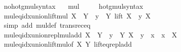 \begin{isabellebody}
\ no{\isacharunderscore}{\kern0pt}hotg{\isacharunderscore}{\kern0pt}mul{\isacharunderscore}{\kern0pt}syntax\ \ \isamarkupfalse%
\ mul\ {\isacharparenleft}{\kern0pt}\ {\isachardoublequoteopen}{\isacharasterisk}{\kern0pt}{\isachardoublequoteclose}\ {}{}{\isacharparenright}{\kern0pt}\ \isamarkupfalse%
\isanewline
{}\isamarkupfalse%
\ hotg{\isacharunderscore}{\kern0pt}mul{\isacharunderscore}{\kern0pt}syntax\isanewline
\isanewline
{}\isamarkupfalse%
\ mul{\isacharunderscore}{\kern0pt}eq{\isacharunderscore}{\kern0pt}idx{\isacharunderscore}{\kern0pt}union{\isacharunderscore}{\kern0pt}lift{\isacharunderscore}{\kern0pt}mul{\isacharcolon}{\kern0pt}\ {\isachardoublequoteopen}X\ {\isacharasterisk}{\kern0pt}\ Y\ {\isacharequal}{\kern0pt}\ {\isacharparenleft}{\kern0pt}{\isasymUnion}y\ {\isasymin}\ Y{\isachardot}{\kern0pt}\ lift\ {\isacharparenleft}{\kern0pt}X\ {\isacharasterisk}{\kern0pt}\ y{\isacharparenright}{\kern0pt}\ X{\isacharparenright}{\kern0pt}{\isachardoublequoteclose}\isanewline
%
\isadelimproof
\ \ %
\endisadelimproof
%
\isatagproof
{}\isamarkupfalse%
\ {\isacharparenleft}{\kern0pt}simp\ add{\isacharcolon}{\kern0pt}\ mul{\isacharunderscore}{\kern0pt}def\ transrec{\isacharunderscore}{\kern0pt}eq{\isacharparenright}{\kern0pt}%
\endisatagproof
{\isafoldproof}%
%
\isadelimproof
\isanewline
%
\endisadelimproof
\isanewline
{}\isamarkupfalse%
\ mul{\isacharunderscore}{\kern0pt}eq{\isacharunderscore}{\kern0pt}idx{\isacharunderscore}{\kern0pt}union{\isacharunderscore}{\kern0pt}repl{\isacharunderscore}{\kern0pt}mul{\isacharunderscore}{\kern0pt}add{\isacharcolon}{\kern0pt}\ {\isachardoublequoteopen}X\ {\isacharasterisk}{\kern0pt}\ Y\ {\isacharequal}{\kern0pt}\ {\isacharparenleft}{\kern0pt}{\isasymUnion}y\ {\isasymin}\ Y{\isachardot}{\kern0pt}\ {\isacharbraceleft}{\kern0pt}X\ {\isacharasterisk}{\kern0pt}\ y\ {\isacharplus}{\kern0pt}\ x\ {\isacharbar}{\kern0pt}\ x\ {\isasymin}\ X{\isacharbraceright}{\kern0pt}{\isacharparenright}{\kern0pt}{\isachardoublequoteclose}\isanewline
%
\isadelimproof
\ \ %
\endisadelimproof
%
\isatagproof
{}\isamarkupfalse%
\ mul{\isacharunderscore}{\kern0pt}eq{\isacharunderscore}{\kern0pt}idx{\isacharunderscore}{\kern0pt}union{\isacharunderscore}{\kern0pt}lift{\isacharunderscore}{\kern0pt}mul{\isacharbrackleft}{\kern0pt}of\ X\ Y{\isacharbrackright}{\kern0pt}\ lift{\isacharunderscore}{\kern0pt}eq{\isacharunderscore}{\kern0pt}repl{\isacharunderscore}{\kern0pt}add\ \isamarkupfalse%

\end{isabellebody}
